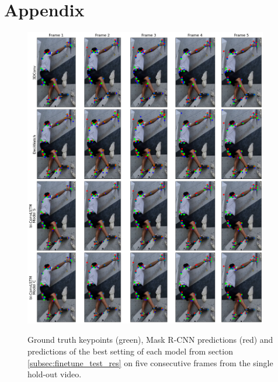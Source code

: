 \documentclass[./main.tex]{subfiles}
\begin{document}
\section*{Appendix}

\begin{figure}[h!]
    \centering
    \includegraphics[width=0.95\textwidth]{./entities/predictions.png}
    \label{fig:predictions}
    \caption{Ground truth keypoints (green), Mask R-CNN predictions (red) and predictions of the best setting of each model from section \ref{subsec:finetune_test_res} on five consecutive frames from the single hold-out video.}
\end{figure}
\end{document}
